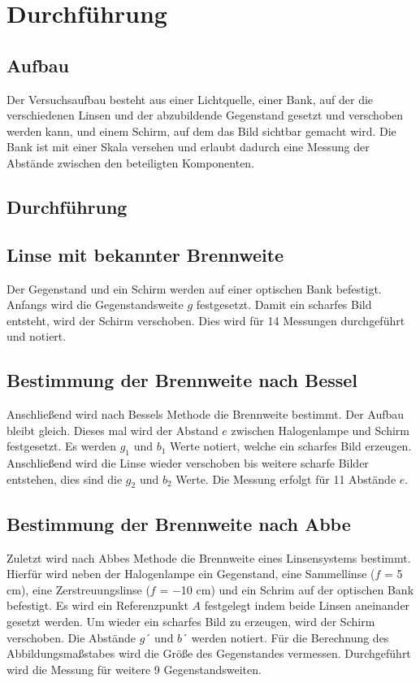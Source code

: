 \section{Durchführung}
\subsection{Aufbau}
Der Versuchsaufbau besteht aus einer Lichtquelle, einer Bank, auf der die verschiedenen
Linsen und der abzubildende Gegenstand gesetzt und verschoben werden kann, und einem
Schirm, auf dem das Bild sichtbar gemacht wird. Die Bank ist mit einer Skala versehen
und erlaubt dadurch eine Messung der Abstände zwischen den beteiligten Komponenten.
\subsection{Durchführung}
\subsection{Linse mit bekannter Brennweite}
Der Gegenstand und ein Schirm werden auf einer optischen Bank befestigt. Anfangs wird
die Gegenstandsweite $g$ festgesetzt. Damit ein scharfes Bild entsteht, wird der Schirm
verschoben. Dies wird für 14 Messungen durchgeführt und notiert.
\subsection{Bestimmung der Brennweite nach Bessel}
Anschließend wird nach Bessels Methode die Brennweite bestimmt. Der Aufbau bleibt
gleich. Dieses mal wird der Abstand $e$ zwischen Halogenlampe und Schirm festgesetzt.
Es werden $g_1$ und $b_1$ Werte notiert, welche ein scharfes Bild erzeugen. Anschließend wird
die Linse wieder verschoben bis weitere scharfe Bilder entstehen, dies sind die $g_2$ und $b_2$
Werte. Die Messung erfolgt für 11 Abstände $e$.
\subsection{Bestimmung der Brennweite nach Abbe}
Zuletzt wird nach Abbes Methode die Brennweite eines Linsensystems bestimmt. Hierfür
wird neben der Halogenlampe ein Gegenstand, eine Sammellinse ($f$ = 5 cm), eine
Zerstreuungslinse ($f$ = −10 cm) und ein Schrim auf der optischen Bank befestigt. Es
wird ein Referenzpunkt $A$ festgelegt indem beide Linsen aneinander gesetzt werden. Um
wieder ein scharfes Bild zu erzeugen, wird der Schirm verschoben. Die Abstände $g´$ und $b´$ werden notiert. Für die Berechnung des Abbildungsmaßstabes wird die Größe des
Gegenstandes vermessen. Durchgeführt wird die Messung für weitere 9 Gegenstandsweiten.

\label{sec:Durchführung}
